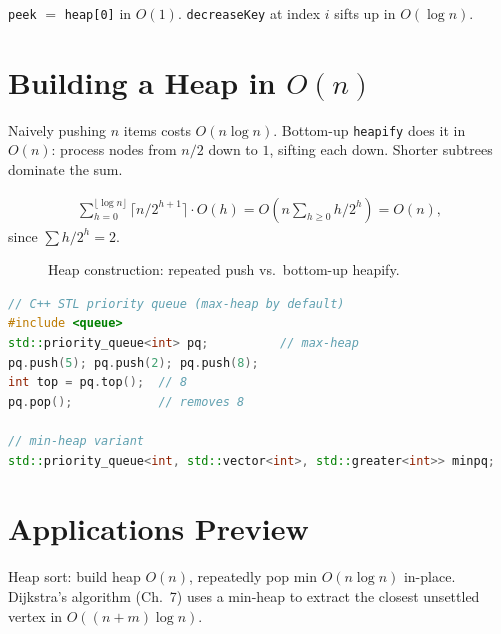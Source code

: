 \texttt{peek} $=$ \texttt{heap[0]} in $O(1)$. \texttt{decreaseKey} at index $i$ sifts up in $O(\log n)$.

\section{Building a Heap in $O(n)$}
\label{sec:build-heap}
Naively pushing $n$ items costs $O(n\log n)$. Bottom-up \texttt{heapify} does it in $O(n)$: process nodes from $n/2$ down to $1$, sifting each down. Shorter subtrees dominate the sum.

\begin{align}
\sum_{h=0}^{\lfloor\log n\rfloor} \lceil n/2^{h+1}\rceil\cdot O(h)
= O\!\left(n\sum_{h\ge0} h/2^{h}\right) = O(n),
\label{eq:build-heap}
\end{align}
since $\sum h/2^{h}=2$.

\begin{figure}[h]
\centering
{}
\caption{Heap construction: repeated push vs.\ bottom-up heapify.}
\label{fig:build-heap-cost}
\end{figure}

\begin{lstlisting}[language=C++]
// C++ STL priority queue (max-heap by default)
#include <queue>
std::priority_queue<int> pq;          // max-heap
pq.push(5); pq.push(2); pq.push(8);
int top = pq.top();  // 8
pq.pop();            // removes 8

// min-heap variant
std::priority_queue<int, std::vector<int>, std::greater<int>> minpq;
\end{lstlisting}

\section{Applications Preview}
Heap sort: build heap $O(n)$, repeatedly pop min $O(n\log n)$ in-place. Dijkstra's algorithm (Ch.~7) uses a min-heap to extract the closest unsettled vertex in $O((n+m)\log n)$.

